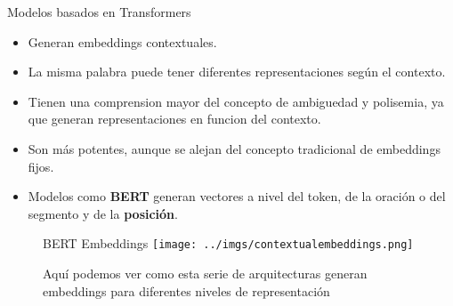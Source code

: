 \documentclass{beamer}
\begin{document}
\begin{frame}{ Modelos basados en Transformers}
\begin{itemize}
\item Generan embeddings contextuales.
\item La misma palabra puede tener diferentes representaciones según el contexto. 
\item Tienen una comprension mayor del concepto de ambiguedad y polisemia, ya que generan representaciones en funcion del contexto.
\item Son más potentes, aunque se alejan del concepto tradicional de embeddings fijos.
\item Modelos como \textbf{BERT} generan vectores a nivel del token, de la oración o del segmento y de la \textbf{posición}.
\end{itemize}
\end{frame}

%
%
%
%  
%  

\begin{frame}
\begin{figure}{BERT Embeddings}
    \centering
    \texttt{[image: ../imgs/contextualembeddings.png]} %
    \caption{\tiny Aquí podemos ver como esta serie de arquitecturas generan embeddings para diferentes niveles de representación}
    \label{miimagen}
\end{figure}
\end{frame}
\end{document}
